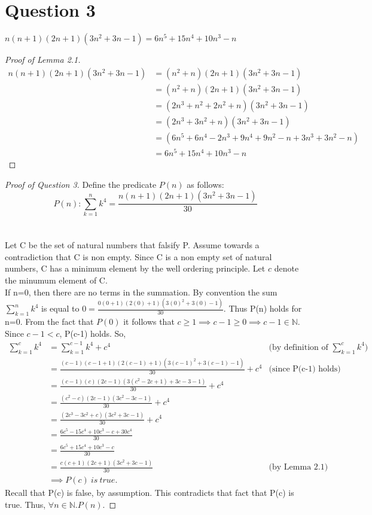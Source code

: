 \documentclass[12pt]{article}
\newenvironment{lemma}[2][Lemma]{\begin{trivlist}
\item[\hskip \labelsep {\bfseries #1}\hskip \labelsep {\bfseries #2.}]}{\end{trivlist}}
\begin{document}
\section*{Question 3}
\begin{lemma}{2.1}
  $ n(n+1)(2n+1)(3n^2 +3n−1) = 6n^5+15n^4+10n^3-n $
\end{lemma}
\begin{proof} [Proof of Lemma 2.1]
  \begin{align*}
  n(n+1)(2n+1)(3n^2 +3n−1) & = (n^2+n)(2n+1)(3n^2 +3n - 1) \\
  & = (n^2+n)(2n+1)(3n^2 +3n−1)  \\
  & = (2n^3+n^2+2n^2+n)(3n^2 +3n−1)  \\
  & = (2n^3+3n^2+n)(3n^2 +3n−1)  \\
  & = (6n^5+6n^4-2n^3+9n^4+9n^2-n+3n^3+3n^2-n) \\
  & = 6n^5+15n^4+10n^3-n
  \end{align*}
\end{proof}
\begin{proof} [Proof of Question 3]
Define the predicate $P(n)$ as follows:
$$ P(n) :  \sum_{k=1}^{n}k^4 = \frac{n(n+1)(2n+1)(3n^2 +3n-1)}{30} $$ \\\\
Let C be the set of natural numbers that falsify P. Assume towards a contradiction that
C is non empty. Since C is a non empty set of natural numbers, C has a minimum element
by the well ordering principle. Let $c$ denote the minumum element of C. \\
\indent If n=0, then there are no terms in the summation. By convention the sum $\sum_{k=1}^{n}k^4$
is equal to $0 = \frac{0(0+1)(2(0)+1)(3(0)^2 +3(0)−1)}{30}$. Thus P(n) holds for n=0. From the fact that $P(0)$
it follows that $c \geq 1 \implies c-1 \geq 0 \implies c-1 \in \mathbb{N}$.
Since $c-1 < c$, P(c-1) holds. So, \\
\begin{align*}
 \sum_{k=1}^{c}k^4 & = \sum_{k=1}^{c-1}k^4 +c^4 &\text{(by definition of $\sum_{k=1}^{c}k^4$)} \\
& = \frac{(c-1)(c-1+1)(2(c-1)+1)(3(c-1)^2+3(c-1)-1)}{30} +c^4 &\text{(since P(c-1) holds)}\\
& = \frac{(c-1)(c)(2c-1)(3(c^2-2c+1)+3c-3-1)}{30} +c^4  \\
& = \frac{(c^2-c)(2c-1)(3c^2-3c-1)}{30} +c^4  \\
& = \frac{(2c^3-3c^2+c)(3c^2+3c-1)}{30} +c^4 \\
& = \frac{6c^5-15c^4+10c^3-c+30c^4}{30} \\
& = \frac{6c^5+15c^4+10c^3-c}{30} \\
& = \frac{c(c+1)(2c+1)(3c^2 +3c−1)}{30} &\text{(by Lemma 2.1)} \\
& \implies P(c) \ is \ true .
\end{align*}
Recall that P(c) is false, by assumption. This contradicts that fact that
P(c) is true. Thus, $\forall n \in \mathbb{N}.P(n)$.
\end{proof}
\end{document}
